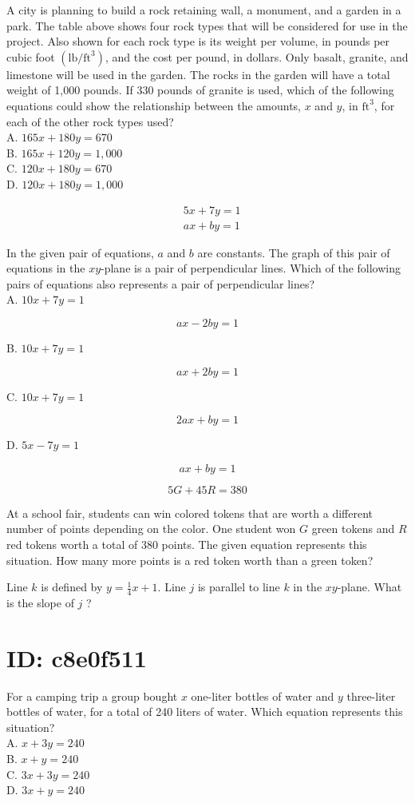 A city is planning to build a rock retaining wall, a monument, and a garden in a park. The table above shows four rock types that will be considered for use in the project. Also shown for each rock type is its weight per volume, in pounds per cubic foot $\left(\mathrm{lb} / \mathrm{ft}^{3}\right)$, and the cost per pound, in dollars. Only basalt, granite, and limestone will be used in the garden. The rocks in the garden will have a total weight of 1,000 pounds. If 330 pounds of granite is used, which of the following equations could show the relationship between the amounts, $x$ and $y$, in $\mathrm{ft}^{3}$, for each of the other rock types used?\\
A. $165 x+180 y=670$\\
B. $165 x+120 y=1,000$\\
C. $120 x+180 y=670$\\
D. $120 x+180 y=1,000$

$$
\begin{aligned}
& 5 x+7 y=1 \\
& a x+b y=1
\end{aligned}
$$

In the given pair of equations, $a$ and $b$ are constants. The graph of this pair of equations in the $x y$-plane is a pair of perpendicular lines. Which of the following pairs of equations also represents a pair of perpendicular lines?\\
A. $10 x+7 y=1$

$$
a x-2 b y=1
$$

B. $10 x+7 y=1$

$$
a x+2 b y=1
$$

C. $10 x+7 y=1$

$$
2 a x+b y=1
$$

D. $5 x-7 y=1$

$$
a x+b y=1
$$

$$
5 G+45 R=380
$$

At a school fair, students can win colored tokens that are worth a different number of points depending on the color. One student won $G$ green tokens and $R$ red tokens worth a total of 380 points. The given equation represents this situation. How many more points is a red token worth than a green token?

Line $k$ is defined by $y=\frac{1}{4} x+1$. Line $j$ is parallel to line $k$ in the $x y$-plane. What is the slope of $j$ ?

\section*{ID: c8e0f511}
For a camping trip a group bought $x$ one-liter bottles of water and $y$ three-liter bottles of water, for a total of 240 liters of water. Which equation represents this situation?\\
A. $x+3 y=240$\\
B. $x+y=240$\\
C. $3 x+3 y=240$\\
D. $3 x+y=240$

